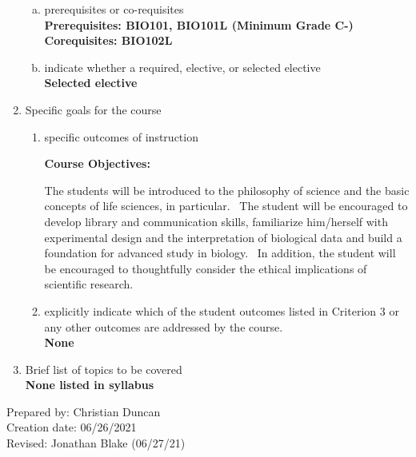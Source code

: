 \begin{enumerate}[1.]
\begin{enumerate}[a.]
\item prerequisites or co-requisites\\
  {\bfseries
    Prerequisites: BIO101, BIO101L (Minimum Grade C-)\\
    Corequisites: BIO102L
  }

\item indicate whether a required, elective, or selected elective\\ %
  {\bfseries
    Selected elective
  }

\end{enumerate}

\item Specific goals for the course
\begin{enumerate}
\item specific outcomes of instruction\\ %
  {\bfseries
    Course Objectives:

    The students will be introduced to the philosophy of science and the basic concepts of life sciences, in particular.  The student will be encouraged to develop library and communication skills, familiarize him/herself with experimental design and the interpretation of biological data and build a foundation for advanced study in biology.  In addition, the student will be encouraged to thoughtfully consider the ethical implications of scientific research.
  }

\item explicitly indicate which of the student outcomes listed in Criterion 3 or any other outcomes are addressed by the course.\\
  {\bfseries
    None
  }
\end{enumerate}

\item Brief list of topics to be covered\\
  {\bfseries
    None listed in syllabus
  }

\end{enumerate}

\noindent Prepared by: Christian Duncan\\
\noindent Creation date: 06/26/2021\\
\noindent Revised: Jonathan Blake (06/27/21)\\
